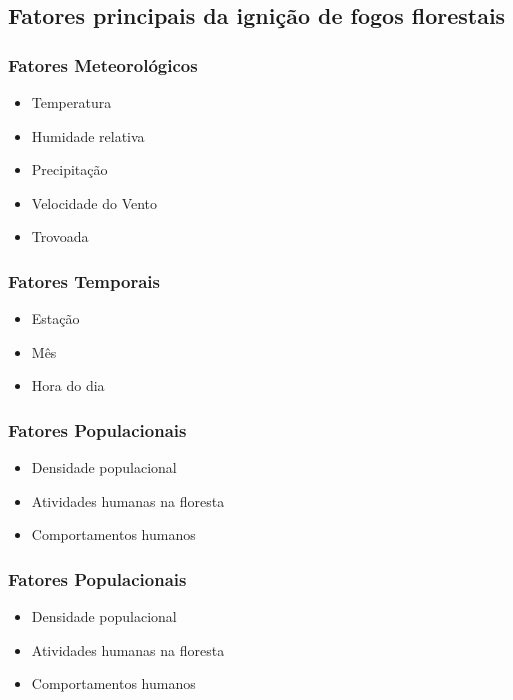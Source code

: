 \documentclass{article}
\begin{document}
\subsection{Fatores principais da ignição de fogos florestais}
\label{sec:main_forest_fire_indicators}
\subsubsection{Fatores Meteorológicos}
\begin{itemize}
    \item Temperatura
    \item Humidade relativa
    \item Precipitação
    \item Velocidade do Vento
    \item Trovoada
\end{itemize}

\subsubsection{Fatores Temporais}
\begin{itemize}
    \item Estação
    \item Mês
    \item Hora do dia
\end{itemize}

\subsubsection{Fatores Populacionais}
\begin{itemize}
    \item Densidade populacional
    \item Atividades humanas na floresta
    \item Comportamentos humanos
\end{itemize}

\subsubsection{Fatores Populacionais}
\begin{itemize}
    \item Densidade populacional
    \item Atividades humanas na floresta
    \item Comportamentos humanos
\end{itemize}
\end{document}
